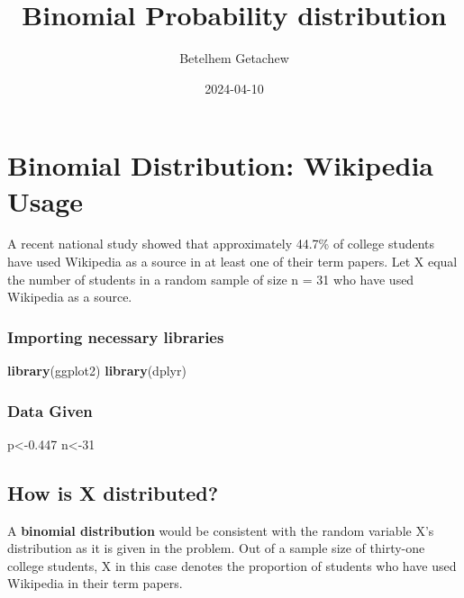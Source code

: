 \documentclass[
]{article}
\title{Binomial Probability distribution}
\author{Betelhem Getachew}
\date{2024-04-10}
\newenvironment{Shaded}{\begin{snugshade}}{\end{snugshade}}
\newcommand{\DecValTok}[1]{\textcolor[rgb]{0.00,0.00,0.81}{#1}}
\newcommand{\FloatTok}[1]{\textcolor[rgb]{0.00,0.00,0.81}{#1}}
\newcommand{\FunctionTok}[1]{\textcolor[rgb]{0.13,0.29,0.53}{\textbf{#1}}}
\newcommand{\NormalTok}[1]{#1}
\newcommand{\OtherTok}[1]{\textcolor[rgb]{0.56,0.35,0.01}{#1}}
\begin{document}
\maketitle

\section{Binomial Distribution: Wikipedia
Usage}\label{binomial-distribution-wikipedia-usage}

A recent national study showed that approximately 44.7\% of college
students have used Wikipedia as a source in at least one of their term
papers. Let X equal the number of students in a random sample of size n
= 31 who have used Wikipedia as a source.

\subsubsection{Importing necessary
libraries}\label{importing-necessary-libraries}

\begin{Shaded}
\begin{Highlighting}[]
\FunctionTok{library}\NormalTok{(ggplot2)}
\FunctionTok{library}\NormalTok{(dplyr)}
\end{Highlighting}
\end{Shaded}

\subsubsection{Data Given}\label{data-given}

\begin{Shaded}
\begin{Highlighting}[]
\NormalTok{p}\OtherTok{\textless{}{-}}\FloatTok{0.447}
\NormalTok{n}\OtherTok{\textless{}{-}}\DecValTok{31}
\end{Highlighting}
\end{Shaded}

\subsection{How is X distributed?}\label{how-is-x-distributed}

A \textbf{binomial distribution} would be consistent with the random
variable X's distribution as it is given in the problem. Out of a sample
size of thirty-one college students, X in this case denotes the
proportion of students who have used Wikipedia in their term papers.
\end{document}
